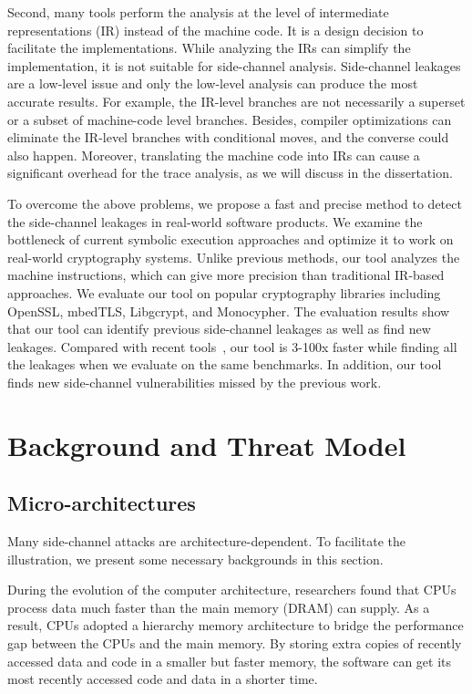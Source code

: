 Second, many tools perform the analysis at the level of intermediate representations (IR) instead of the machine code. It is a design decision to facilitate the implementations. While analyzing the IRs can simplify the implementation, it is not suitable for side-channel analysis.  Side-channel leakages are a low-level issue and only the low-level analysis can produce the most accurate results. For example, the IR-level branches are not necessarily a superset or a subset of machine-code level branches. Besides, compiler optimizations can eliminate the IR-level branches with conditional moves, and the converse could also happen. Moreover, translating the machine code into IRs can cause a significant overhead for the trace analysis, as we will discuss in the dissertation.

To overcome the above problems, we propose a fast and precise method to detect the side-channel leakages in real-world software products. We examine the bottleneck of current symbolic execution approaches and optimize it to work on real-world cryptography systems. Unlike previous methods, our tool analyzes the machine instructions, which can give more precision than traditional IR-based approaches. We evaluate our tool on popular cryptography libraries including OpenSSL, mbedTLS, Libgcrypt, and Monocypher. The evaluation results show that our tool can identify previous side-channel leakages as well as find new leakages. Compared with recent tools~\cite{203878,217537,Wichelmann:2018:MFF:3274694.3274741}, our tool is 3-100x faster while finding all the leakages when we evaluate on the same benchmarks. In addition, our tool finds new side-channel vulnerabilities missed by the previous work. 

\section{Background and Threat Model}
\subsection{Micro-architectures}
Many side-channel attacks are architecture-dependent. To facilitate the illustration, we present some necessary backgrounds in this section.

During the evolution of the computer architecture, researchers found that CPUs process data much faster than the main memory (DRAM) can supply. As a result, CPUs adopted a hierarchy memory architecture to bridge the performance gap between the CPUs and the main memory. By storing extra copies of recently accessed data and code in a smaller but faster memory, the software can get its most recently accessed code and data in a shorter time.

